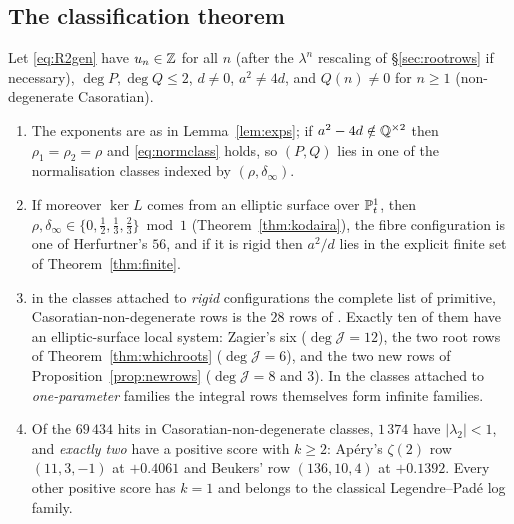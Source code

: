 \subsection{The classification theorem}

\begin{namedthm}\label{thm:herfclass}
Let \eqref{eq:R2gen} have $u_n\in\mathbb{Z}$ for all $n$ \textup{(}after the $\lambda^n$
rescaling of \S\ref{sec:rootrows} if necessary\textup{)}, $\deg P,\deg Q\le2$,
$d\neq0$, $a^2\neq4d$, and $Q(n)\neq0$ for $n\ge1$ \textup{(}non-degenerate
Casoratian\textup{)}.
\begin{enumerate}[label=\textup{(\roman*)},leftmargin=2.4em]
\item \Proved{} The exponents are as in Lemma~\ref{lem:exps}; if $a^2-4d\notin\mathbb{Q}^{\times2}$
then $\rho_1=\rho_2=\rho$ and \eqref{eq:normclass} holds, so $(P,Q)$ lies in one of
the normalisation classes indexed by $(\rho,\delta_\infty)$.
\item \Proved{} If moreover $\ker L$ comes from an elliptic surface over
$\mathbb{P}^1_t$, then $\rho,\delta_\infty\in\{0,\tfrac12,\tfrac13,\tfrac23\}\bmod1$
\textup{(}Theorem~\ref{thm:kodaira}\textup{)}, the fibre configuration is one of
Herfurtner's $56$, and if it is rigid then $a^2/d$ lies in the explicit finite
set of Theorem~\ref{thm:finite}.
\item {}
in the classes attached to \emph{rigid}
configurations the complete list of primitive, Casoratian-non-degenerate rows is
the $28$ rows of \cite[\S6.1]{ProjHerfurtner}. Exactly ten of them have an
elliptic-surface local system: Zagier's six ($\deg\mathcal J=12$), the two root
rows of Theorem~\ref{thm:whichroots} ($\deg\mathcal J=6$), and the two new rows
of Proposition~\ref{prop:newrows} ($\deg\mathcal J=8$ and $3$). In the classes
attached to \emph{one-parameter} families the integral rows themselves form
infinite families.
\item {} Of the $69\,434$ hits in Casoratian-non-degenerate
classes, $1\,374$ have $|\lambda_2|<1$, and \emph{exactly two} have a positive
score with $k\ge2$: Ap\'ery's $\zeta(2)$ row $(11,3,-1)$ at $+0.4061$ and
Beukers' row $(136,10,4)$ at $+0.1392$. Every other positive score has $k=1$ and
belongs to the classical Legendre--Pad\'e log family.
\end{enumerate}
\end{namedthm}

